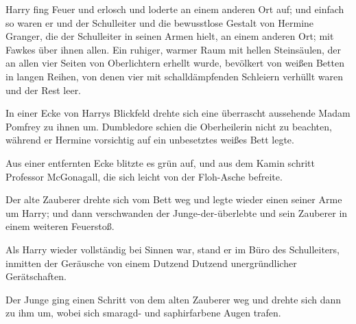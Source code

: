 Harry fing Feuer und erlosch und loderte an einem anderen Ort auf; und einfach so waren er und der Schulleiter und die bewusstlose Gestalt von Hermine Granger, die der Schulleiter in seinen Armen hielt, an einem anderen Ort; mit Fawkes über ihnen allen. Ein ruhiger, warmer Raum mit hellen Steinsäulen, der an allen vier Seiten von Oberlichtern erhellt wurde, bevölkert von weißen Betten in langen Reihen, von denen vier mit schalldämpfenden Schleiern verhüllt waren und der Rest leer.

In einer Ecke von Harrys Blickfeld drehte sich eine überrascht aussehende Madam Pomfrey zu ihnen um. Dumbledore schien die Oberheilerin nicht zu beachten, während er Hermine vorsichtig auf ein unbesetztes weißes Bett legte.

Aus einer entfernten Ecke blitzte es grün auf, und aus dem Kamin schritt Professor McGonagall, die sich leicht von der Floh-Asche befreite.

Der alte Zauberer drehte sich vom Bett weg und legte wieder einen seiner Arme um Harry; und dann verschwanden der Junge-der-überlebte und sein Zauberer in einem weiteren Feuerstoß.

\later

Als Harry wieder vollständig bei Sinnen war, stand er im Büro des Schulleiters, inmitten der Geräusche von einem Dutzend Dutzend unergründlicher Gerätschaften.

Der Junge ging einen Schritt von dem alten Zauberer weg und drehte sich dann zu ihm um, wobei sich smaragd- und saphirfarbene Augen trafen.

